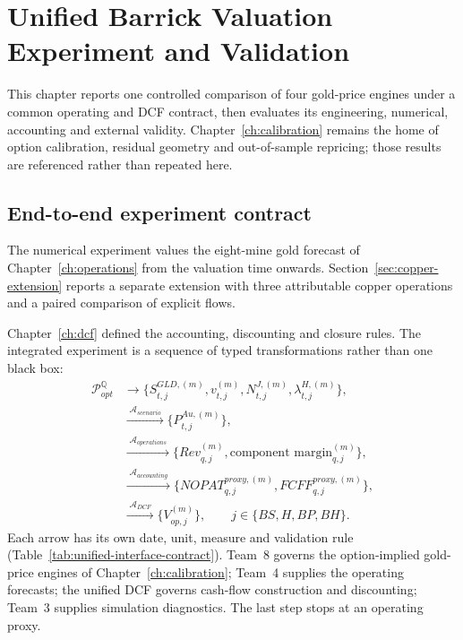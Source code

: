 \chapter{Unified Barrick Valuation Experiment and Validation}
\label{ch:unified-experiment}

This chapter reports one controlled comparison of four gold-price engines
under a common operating and DCF contract, then evaluates its engineering,
numerical, accounting and external validity. Chapter~\ref{ch:calibration} remains the home of
option calibration, residual geometry and out-of-sample repricing; those
results are referenced rather than repeated here.

\section{End-to-end experiment contract}

The numerical experiment values the eight-mine gold forecast of Chapter~\ref{ch:operations}
from the valuation time onwards. Section~\ref{sec:copper-extension} reports a
separate extension with three attributable copper operations and a paired
comparison of explicit flows.

Chapter~\ref{ch:dcf} defined the accounting, discounting and closure rules. The
integrated experiment is a sequence of typed transformations rather than one
black box:
\begin{align}
\mathcal P_{opt}^{\mathbb Q}
&\longrightarrow
\{S_{t,j}^{GLD,(m)},v_{t,j}^{(m)},N_{t,j}^{J,(m)},
\lambda_{t,j}^{H,(m)}\},\\
&\xrightarrow{\;\mathcal A_{scenario}\;}
\{P_{t,j}^{Au,(m)}\},\\
&\xrightarrow{\;\mathcal A_{operations}\;}
\{Rev_{q,j}^{(m)},\text{component margin}_{q,j}^{(m)}\},\\
&\xrightarrow{\;\mathcal A_{accounting}\;}
\{NOPAT_{q,j}^{proxy,(m)},FCFF_{q,j}^{proxy,(m)}\},\\
&\xrightarrow{\;\mathcal A_{DCF}\;}
\{V_{op,j}^{(m)}\},
\qquad j\in\{BS,H,BP,BH\}.
\end{align}
Each arrow has its own date, unit, measure and validation rule
(Table~\ref{tab:unified-interface-contract}). Team~8 governs
the option-implied gold-price engines of Chapter~\ref{ch:calibration}; Team~4 supplies the
operating forecasts; the unified DCF governs cash-flow construction and
discounting; Team~3 supplies simulation diagnostics. The last step stops at
an operating proxy.

